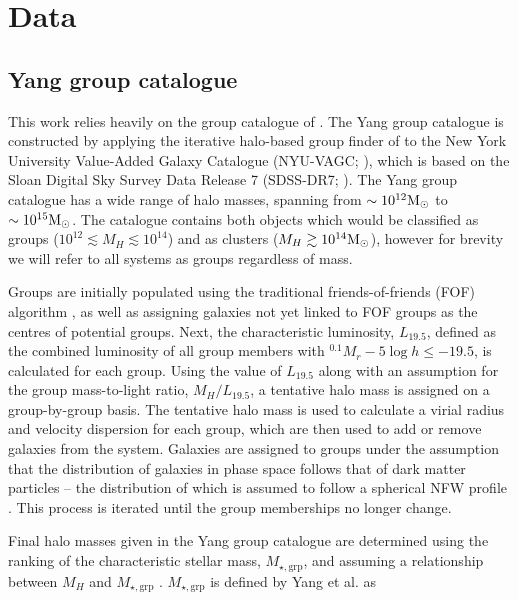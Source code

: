 \section{Data}
\label{sec:data_x}

\subsection{Yang group catalogue}

This work relies heavily on the group catalogue of \citet{yang2007}.
The Yang group catalogue is constructed by applying the iterative
halo-based group finder of \citet{yang2005, yang2007} to the New York
University Value-Added Galaxy Catalogue (NYU-VAGC;
\citealt{blanton2005a}), which is based on the Sloan Digital Sky
Survey Data Release 7 (SDSS-DR7; \citealt{abazajian2009}).  The Yang
group catalogue has a wide range of halo masses, spanning from $\sim
10^{12}\mathrm{M_{\odot}}$ to $\sim 10^{15}\mathrm{M_{\odot}}$.  The catalogue contains both
objects which would be classified as groups ($10^{12} \lesssim M_H
\lesssim 10^{14}$) and as clusters ($M_H \gtrsim 10^{14}\mathrm{M_{\odot}}$),
however for brevity we will refer to all systems as groups regardless
of mass.
\par
Groups are initially populated using the traditional
friends-of-friends (FOF) algorithm \citep[e.g.][]{huchra1982}, as well
as assigning galaxies not yet linked to FOF groups as the centres of
potential groups.  Next, the characteristic luminosity, $L_{19.5}$,
defined as the combined luminosity of all group members with
$^{0.1}M_r - 5\log h \le -19.5$, is calculated for each group.  Using
the value of $L_{19.5}$ along with an assumption for the group
mass-to-light ratio, $M_H/L_{19.5}$, a tentative halo mass is assigned
on a group-by-group basis.  The tentative halo mass is used to
calculate a virial radius and velocity dispersion for each group,
which are then used to add or remove galaxies from the system.
Galaxies are assigned to groups under the assumption that the
distribution of galaxies in phase space follows that of dark matter
particles -- the distribution of which is assumed to follow a
spherical NFW profile \citep{navarro1997}.  This process is iterated
until the group memberships no longer change.
\par
Final halo masses given in the Yang group catalogue are determined
using the ranking of the characteristic stellar mass,
$M_{\star,\mathrm{grp}}$, and assuming a relationship between $M_H$
and $M_{\star,\mathrm{grp}}$ \citep{yang2007}.
$M_{\star,\mathrm{grp}}$ is defined by Yang et al. as

